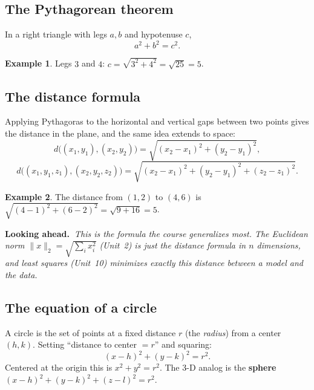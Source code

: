 \documentclass[11pt]{article}
\theoremstyle{definition}
\newtheorem{example}{Example}[section]
\newcommand{\lookahead}[1]{%
  \par\smallskip\noindent
  {\sffamily\bfseries\color{BrickRed}Looking ahead.~}\textit{#1}\par\smallskip}
\begin{document}
\subsection{The Pythagorean theorem}
In a right triangle with legs $a,b$ and hypotenuse $c$,
\[
a^2+b^2=c^2 .
\]

\begin{center}
\end{center}

\begin{example}
Legs $3$ and $4$: $c=\sqrt{3^2+4^2}=\sqrt{25}=5$.
\end{example}

\subsection{The distance formula}
Applying Pythagoras to the horizontal and vertical gaps between two points gives
the distance in the plane, and the same idea extends to space:
\[
d\bigl((x_1,y_1),(x_2,y_2)\bigr)=\sqrt{(x_2-x_1)^2+(y_2-y_1)^2},
\]
\[
d\bigl((x_1,y_1,z_1),(x_2,y_2,z_2)\bigr)=\sqrt{(x_2-x_1)^2+(y_2-y_1)^2+(z_2-z_1)^2}.
\]

\begin{example}
The distance from $(1,2)$ to $(4,6)$ is $\sqrt{(4-1)^2+(6-2)^2}=\sqrt{9+16}=5$.
\end{example}

\lookahead{This is \emph{the} formula the course generalizes most. The
Euclidean norm $\|x\|_2=\sqrt{\sum_i x_i^2}$ (Unit~2) is just the distance formula
in $n$ dimensions, and least squares (Unit~10) minimizes exactly this distance
between a model and the data.}

\subsection{The equation of a circle}
A circle is the set of points at a fixed distance $r$ (the \emph{radius}) from a
center $(h,k)$. Setting ``distance to center $=r$'' and squaring:
\[
(x-h)^2+(y-k)^2=r^2 .
\]
Centered at the origin this is $x^2+y^2=r^2$. The 3-D analog is the \textbf{sphere}
$(x-h)^2+(y-k)^2+(z-l)^2=r^2$.
\end{document}
